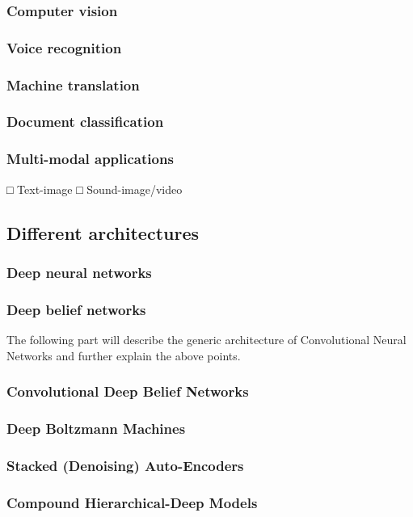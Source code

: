 \documentclass[a4paper]{report}
\begin{document}
		\subsubsection{Computer vision}
		\subsubsection{Voice recognition}
		\subsubsection{Machine translation}
		\subsubsection{Document classification}
		\subsubsection{Multi-modal applications}
			□ Text-image
			□ Sound-image/video
	\subsection{Different architectures}
		\subsubsection{Deep neural networks}		
		\subsubsection{Deep belief networks}
		
						
			The following part will describe the generic architecture of Convolutional Neural Networks and further explain the above points.

			

			
			
			
		\subsubsection{Convolutional Deep Belief Networks}
		\subsubsection{Deep Boltzmann Machines}
		\subsubsection{Stacked (Denoising) Auto-Encoders}
		\subsubsection{Compound Hierarchical-Deep Models}
\end{document}
